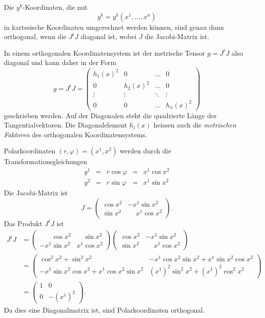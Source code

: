 \begin{satz}
Die $y^k$-Koordinaten, die mit
\[
y^k
=
y^k(x^1,\dots,x^n)
\]
in kartesische Koordinaten umgerechnet werden können, sind genau dann
orthogonal, wenn die $J^tJ$ diagonal ist, wobei $J$ die Jacobi-Matrix
ist.
\end{satz}

In einem orthogonalen Koordinatensystem ist der metrische Tensor $g = J^tJ$
also diagonal und kann daher in der Form
\[
g
=
J^tJ
=
\begin{pmatrix}
 h_1(x)^2 &   0    & \dots  &    0   \\
   0    & h_2(x)^2 & \dots  &    0   \\[-2pt]
 \vdots & \vdots & \ddots & \vdots \\
   0    &   0    & \dots  & h_n(x)^2
\end{pmatrix}
\]
geschrieben werden.
Auf der Diagonalen steht die quadrierte Länge der Tangentialvektoren.
Die Diagonalelement $h_i(x)$ heissen auch die {\em metrischen Faktoren}
%
%
des orthogonalen Koordinatensystems.

\begin{beispiel}
Polarkoordinaten $(r,\varphi)=(x^1,x^2)$ werden durch die
%
Transformationsgleichungen
\begin{equation*}
\renewcommand{\arraycolsep}{2pt}
\begin{array}{rclcl}
y^1 &=& r \cos\varphi &=& x^1 \cos x^2 \\
y^2 &=& r \sin\varphi &=& x^1 \sin x^2
\end{array}
\end{equation*}
Die Jacobi-Matrix ist
\[
J
=
\begin{pmatrix}
\cos x^2 &          - x^1 \sin x^2 \\
\sin x^2 & \phantom{-}x^1 \cos x^2
\end{pmatrix}.
\]
Das Produkt $J^tJ$ ist
\begin{align*}
J^tJ
&=
\begin{pmatrix}
\phantom{-x^1}\cos x^2 & \phantom{x^1}\sin x^2 \\
         -x^1 \sin x^2 &          x^1 \cos x^2
\end{pmatrix}
\begin{pmatrix}
\cos x^2 &          - x^1 \sin x^2 \\
\sin x^2 & \phantom{-}x^1 \cos x^2
\end{pmatrix}
\\
&=
\begin{pmatrix}
\cos^2 x^2 + \sin^2 x^2
&-x^1\cos x^2\sin x^2 + x^1\sin x^2\cos x^2
\\
-x^1\sin x^2\cos x^2 +x^1\cos x^2\sin x^2
&(x^1)^2 \sin^2 x^2 + (x^1)^2 \cos^2 x^2
\end{pmatrix}
\\
&=
\begin{pmatrix}
1 & 0 \\
0 & -(x^1)^2
\end{pmatrix}.
\end{align*}
Da dies eine Diagonalmatrix ist, sind Polarkoordinaten orthogonal.
\end{beispiel}


